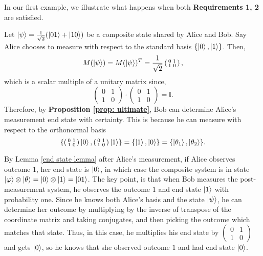 In our first example, we illustrate what happens when both {\bf{Requirements 1, 2}} are satisfied.
\begin{example}
\label{example good}
Let $\ket{\psi}=\frac{1}{\sqrt{2}}(\ket{01}+\ket{10})$ be a composite state shared by Alice and Bob.  Say Alice chooses to measure with respect to the standard basis $\{\ket{0}, \ket{1}\}$.  Then,
\begin{equation*}
M(\ket{\psi})=M(\ket{\psi})^T= \frac{1}{\sqrt{2}}\left(\begin{smallmatrix}0 & 1\\1 & 0\end{smallmatrix}\right),
\end{equation*}
which is a scalar multiple of a unitary matrix since,
\begin{equation*}
\left(\begin{smallmatrix}0 & 1\\1 & 0\end{smallmatrix}\right)\cdot \left(\begin{smallmatrix}0 & 1\\1 & 0\end{smallmatrix}\right)=\mathbb{I}.
\end{equation*}
Therefore, by \textbf{Proposition \ref{prop: ultimate}}, Bob can determine Alice's measurement end state with certainty. This is because he can measure with respect to the orthonormal basis
\begin{equation*}
\{\left(\begin{smallmatrix}0 & 1\\1 & 0\end{smallmatrix}\right)\ket{0}, \left(\begin{smallmatrix}0 & 1\\1 & 0\end{smallmatrix}\right)\ket{1}\}=\{\ket{1}, \ket{0}\}=\{\ket{\theta_1},\ket{\theta_2}\}.
\end{equation*}

By Lemma \ref{end state lemma} after Alice's measurement, if Alice observes outcome $1$, her end state is $\ket{0}$, in which case the composite system is in state $\ket{\varphi}\otimes \ket{\theta}=\ket{0}\otimes\ket{1}=\ket{01}$.  The key point, is that when Bob measures the post-measurement system, he observes the outcome $1$ and end state $\ket{1}$ with probability one.  Since he knows both Alice's basis and the state $\ket{\psi}$, he can determine her outcome by multiplying by the inverse of transpose of the coordinate matrix and taking conjugates, and then picking the outcome which matches that state.  Thus, in this case, he multiplies his end state by $\left(\begin{smallmatrix}0&1\\1&0\end{smallmatrix}\right)$ and gets $\ket{0}$, so he knows that she observed outcome $1$  and had end state $\ket{0}$.


\end{example}
